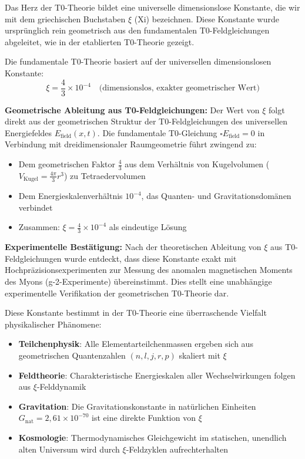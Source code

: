 \documentclass[12pt,a4paper]{article}
\theoremstyle{definition}
\theoremstyle{remark}
\begin{document}
	Das Herz der T0-Theorie bildet eine universelle dimensionslose Konstante, die wir mit dem griechischen Buchstaben $\xi$ (Xi) bezeichnen. Diese Konstante wurde urspr\"unglich rein geometrisch aus den fundamentalen T0-Feldgleichungen abgeleitet, wie in der etablierten T0-Theorie \cite{T0Theory} gezeigt.
	
	Die fundamentale T0-Theorie basiert auf der universellen dimensionslosen Konstante:
	\begin{equation}
		\xi = \frac{4}{3} \times 10^{-4} \quad \text{(dimensionslos, exakter geometrischer Wert)}
	\end{equation}
	
	\textbf{Geometrische Ableitung aus T0-Feldgleichungen:} Der Wert von $\xi$ folgt direkt aus der geometrischen Struktur der T0-Feldgleichungen des universellen Energiefeldes $E_{\text{field}}(x,t)$. Die fundamentale T0-Gleichung $\square E_{\text{field}} = 0$ in Verbindung mit dreidimensionaler Raumgeometrie f\"uhrt zwingend zu:
	\begin{itemize}
		\item Dem geometrischen Faktor $\frac{4}{3}$ aus dem Verh\"altnis von Kugelvolumen ($V_{\text{Kugel}} = \frac{4\pi}{3}r^3$) zu Tetraedervolumen
		\item Dem Energieskalenverh\"altnis $10^{-4}$, das Quanten- und Gravitationsdom\"anen verbindet
		\item Zusammen: $\xi = \frac{4}{3} \times 10^{-4}$ als eindeutige L\"osung
	\end{itemize}
	
	\textbf{Experimentelle Best\"atigung:} Nach der theoretischen Ableitung von $\xi$ aus T0-Feldgleichungen wurde entdeckt, dass diese Konstante exakt mit Hochpr\"azisionsexperimenten zur Messung des anomalen magnetischen Moments des Myons (g-2-Experimente) \"ubereinstimmt. Dies stellt eine unabh\"angige experimentelle Verifikation der geometrischen T0-Theorie dar.
	
	Diese Konstante bestimmt in der T0-Theorie eine \"uberraschende Vielfalt physikalischer Ph\"anomene:
	\begin{itemize}
		\item \textbf{Teilchenphysik}: Alle Elementarteilchenmassen ergeben sich aus geometrischen Quantenzahlen $(n,l,j,r,p)$ skaliert mit $\xi$
		\item \textbf{Feldtheorie}: Charakteristische Energieskalen aller Wechselwirkungen folgen aus $\xi$-Felddynamik
		\item \textbf{Gravitation}: Die Gravitationskonstante in nat\"urlichen Einheiten $G_{\text{nat}} = 2{,}61 \times 10^{-70}$ ist eine direkte Funktion von $\xi$
		\item \textbf{Kosmologie}: Thermodynamisches Gleichgewicht im statischen, unendlich alten Universum wird durch $\xi$-Feldzyklen aufrechterhalten
	\end{itemize}
	
\end{document}
